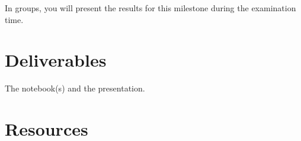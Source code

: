 In groups, you will present the results for this milestone during the
examination time.

\section{Deliverables}

The notebook(s) and the presentation.

\section{Resources}





\begin{comment}

\subsection{Using (also) the lost phase in IBMC}
There are different alternatives for recovering the ``lost'' phases
(remember that we have two subbands, and two downsamplers) during the
DWT (in the 1D case). The result of this procedure is know as the
Overcomplete DWT (ODWT). Notice, however, that we are not interested
in encoding the ODWT domain, but in encoding the DWT that is more
compact. To achieve this, at least the following techniques can be
used:

\subsection{Performing IBMC in the 1-levels MDWT domain}
Once that the missing phases have been recovered, the MC procedure
between two frames (the reference frame $R$ and the predicted frame
$P$) that we are going to implement is:
\begin{enumerate}
\item  Therefore, estimate the motion between the overcomplete
  low-frequency subband of the reference frame $[R.L]$ and the
  overcomplete low-frequency subband of the predicted frame
  $[P.L]$. The output of this step is a motion vectors field
  $\overrightarrow{V}$, that describes how to project the $[R.L]$ onto
  $[P.L]$. Notice that $\overrightarrow{V}$ should be also a good
  candidate for mapping $R$ onto $P$.
  
\item Use $\overrightarrow{V}$ and $[R.H]$ (notice that in 2D case,
  $[R.H]=\{[R.HL], [R.LH], [R.HH]\}$) to generate a prediction
  $[\hat{P}.L]$. We define the prediction error
  in the overcomplete low-frequency subband as
  \begin{equation}
    [E.L] = [P.L] - [\hat{P}.L],
    \label{eq:prediction_error_L}
  \end{equation}
  and the prediction error in the overcomplete high-frequency subband
  as
  \begin{equation}
    [E.H] = [P.H] - [\hat{P}.H].
    \label{eq:prediction_error}
  \end{equation}


\end{comment}
